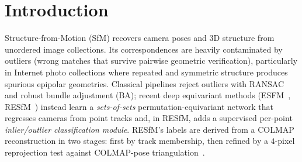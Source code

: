 \documentclass{article}
\begin{document}
\begin{abstract}
retains the in-distribution regime and the cleanest OOD mean (self-supervised arms within
$\sim\!38\%$ in distribution). Every comparison is backed by five-training-seed bands, a
paired-seed evaluation control, and an environment-noise study --- in a benchmark family
where prior work fixes a single seed. We trace this to a structural circularity: outlier labels
require a trusted reconstruction of the very scenes whose contamination makes
reconstruction hard (for \emph{any} gold-standard labeler, not just COLMAP), and we
measure the resulting \emph{label ceiling}: regenerating supervision from scratch, label
recall collapses from $0.82$ to $\sim\!0.3$ above $\sim\!15\%$ contamination, precisely
where robustness is needed. Label-free adaptivity is thus a missing ingredient for robust
deep SfM.
\end{abstract}

\section{Introduction}
Structure-from-Motion (SfM) recovers camera poses and 3D structure from unordered image
collections. Its correspondences are heavily contaminated by outliers (wrong matches
that survive pairwise geometric verification), particularly in Internet photo collections
where repeated and symmetric structure produces spurious epipolar geometries. Classical
pipelines reject outliers with RANSAC and robust bundle adjustment (BA); recent deep
equivariant methods (ESFM~\citep{esfm}, RESfM~\citep{resfm}) instead learn a
\emph{sets-of-sets} permutation-equivariant network that regresses cameras from point
tracks and, in RESfM, adds a supervised per-point \emph{inlier/outlier classification
module}. RESfM's labels are derived from a COLMAP~\citep{colmap} reconstruction in two
stages: first by track membership, then refined by a $4$-pixel reprojection test against
COLMAP-pose triangulation~\citep{resfm}.
\end{document}
